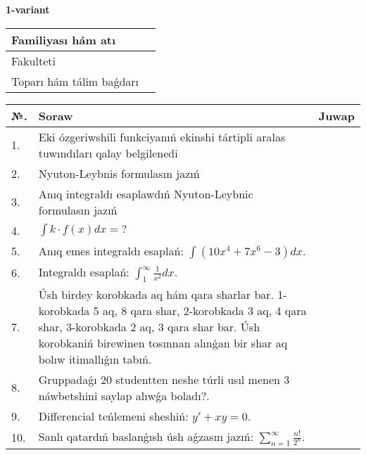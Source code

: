 \documentclass{article}
\begin{document}
\large
{}


\begin{center}\textbf{1-variant}\end{center}

\bgroup
\def\arraystretch{1.5}
\begin{tabular}{ |m{6cm}|m{10cm}| }
  \hline
  Familiyası hám atı & \\
  \hline
  Fakulteti &\\
  \hline
  Toparı hám tálim baǵdarı & \\
  \hline
\end{tabular}
\egroup

\vspace{0.5cm}

\bgroup
\def\arraystretch{2}
\begin{tabular}{ |l|m{8cm}|m{7cm}| }
  \hline
  №. & Soraw & Juwap \\
  \hline
  1. & Eki ózgeriwshili funkciyanıń ekinshi tártipli aralas tuwındıları qalay belgilenedi &  \\
  \hline
  2. & Nyuton-Leybnis formulasın jazıń &  \\
  \hline
  3. & Anıq integraldı esaplawdıń Nyuton-Leybnic formulasın jazıń &  \\
  \hline
  4. & $\displaystyle\int k \cdot f(x)dx = ?$ &  \\
  \hline
  5. & Anıq emes integraldı esaplań: $\displaystyle\int \left( 10x^{4} + 7x^{6} - 3 \right)dx$. &  \\
  \hline
  6. & Integraldı esaplań: $\displaystyle\int_{1}^{\infty}{\frac{1}{x^{2}}dx}$. &  \\
  \hline
  7. & Úsh birdey korobkada aq hám qara sharlar bar. 1-korobkada 5 aq, 8 qara shar, 2-korobkada 3 aq, 4 qara shar, 3-korobkada 2 aq, 3 qara shar bar. Úsh korobkaniń birewinen tosınnan alınǵan bir shar aq bolıw itimallıǵın tabıń. &  \\
  \hline
  8. & Gruppadaǵı 20 studentten neshe túrli usıl menen 3 náwbetshini saylap alıwǵa boladı?. &  \\
  \hline
  9. & Differencial teńlemeni sheshiń: $y' + xy = 0$. &  \\
  \hline
  10. & Sanlı qatardıń baslanǵısh úsh aǵzasın jazıń: $\displaystyle\sum_{n = 1}^{\infty}\frac{n!}{2^{n}}$. &  \\
  \hline
\end{tabular}
\egroup

\vspace{1cm}
\end{document}

